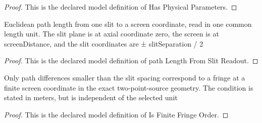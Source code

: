 \begin{proof}
  This is the declared model definition of Has Physical Parameters.
\end{proof}
\begin{definition}
  \label{def:physics:phyx-mini-0248:phyxminiproblems-problemphyxmini0248-pathlengthfromslitreadout}
  Euclidean path length from one slit to a screen coordinate, read in one common length unit. The slit plane is at axial coordinate zero, the screen is at screenDistance, and the slit coordinates are ± slitSeparation / 2
\end{definition}
\begin{proof}
  This is the declared model definition of path Length From Slit Readout.
\end{proof}
\begin{definition}
  \label{def:physics:phyx-mini-0248:phyxminiproblems-problemphyxmini0248-isfinitefringeorder}
  Only path differences smaller than the slit spacing correspond to a fringe at a finite screen coordinate in the exact two-point-source geometry. The condition is stated in meters, but is independent of the selected unit
\end{definition}
\begin{proof}
  This is the declared model definition of Is Finite Fringe Order.
\end{proof}
